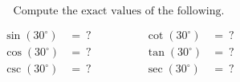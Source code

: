 $$
\text{Compute the exact values of the following.}
$$

$$
\begin{align*}
  \sin(30^{\circ}) &=\ ? \qquad&\qquad \cot(30^{\circ}) &=\ ? \\[2ex]
  \cos(30^{\circ}) &=\ ? \qquad&\qquad \tan(30^{\circ}) &=\ ? \\[2ex]
  \csc(30^{\circ}) &=\ ? \qquad&\qquad \sec(30^{\circ}) &=\ ?
\end{align*}
$$
